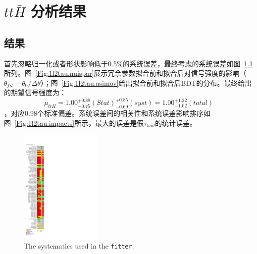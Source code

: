 \chapter{$tt\bar{H}$ 分析结果}\label{chap:ttH_results}

\section{\ltwotau 结果}
首先忽略归一化或者形状影响低于0.5\%的系统误差，最终考虑的系统误差如图~\ref{Fig:1l2tau.pruning}所列。图~\ref{Fig:1l2tau.nuispar}展示冗余参数拟合前和拟合后对信号强度的影响（$\theta_{fit}-\theta_{0}/\Delta\theta$）；图~\ref{Fig:1l2tau.asimov}给出拟合前和拟合后BDT的分布。最终给出的期望信号强度为：$$\mu_{ttH}=1.00^{+0.88}_{-0.75}(Stat)^{+0.85}_{-0.69}(syst)=1.00^{+1.22}_{-1.02}(total)$$，对应0.98个标准偏差。系统误差间的相关性和系统误差影响排序如图~\ref{Fig:1l2tau.impacts}所示，最大的误差是假$\tau_{had}$的统计误差。

\begin{figure}[htbp]
\centering
\begin{center}
\includegraphics[width=0.35\textwidth, height=0.8\textheight]{fig/OneLepTwoTaus/Pruning.pdf}
\end{center}
\caption{The systematics used in the \texttt{fitter}.}
\label{Fig:1l2tau.pruning}
\end{figure}


